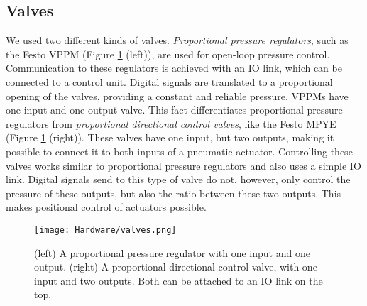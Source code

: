 \subsection{Valves}
We used two different kinds of valves. \textit{Proportional pressure regulators}, such as the Festo VPPM (Figure \ref{fig:valves} (left)), are used for open-loop pressure control. Communication to these regulators is achieved with an IO link, which can be connected to a control unit. Digital signals are translated to a proportional opening of the valves, providing a constant and reliable pressure. VPPMs have one input and one output valve. This fact differentiates proportional pressure regulators from \textit{proportional directional control valves}, like the Festo MPYE (Figure \ref{fig:valves} (right)). These valves have one input, but two outputs, making it possible to connect it to both inputs of a pneumatic actuator. Controlling these valves works similar to proportional pressure regulators and also uses a simple IO link. Digital signals send to this type of valve do not, however, only control the pressure of these outputs, but also the ratio between these two outputs. This makes positional control of actuators possible.

\begin{figure}[ht!]
    \texttt{[image: Hardware/valves.png]}
    \centering
    \caption{(left) A proportional pressure regulator with one input and one output. (right) A proportional directional control valve, with one input and two outputs. Both can be attached to an IO link on the top.}
    \label{fig:valves}
\end{figure}

